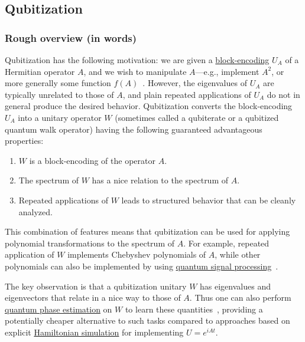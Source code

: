 \newpage



\begin{refsection}

\subsection{Qubitization}\label{prim:Qubitization}

\subsubsection*{Rough overview (in words)}
Qubitization has the following motivation: we are given a \hyperref[prim:BlockEncodings]{block-encoding} $U_A$ of a Hermitian operator $A$, and we wish to manipulate $A$---e.g., implement $A^2$, or more generally some function $f(A)$~\cite{low2016HamSimQubitization}. However, the eigenvalues of $U_A$ are typically unrelated to those of $A$, and plain repeated applications of $U_A$ do not in general produce the desired behavior. Qubitization converts the block-encoding $U_A$ into a unitary operator $W$ (sometimes called a qubiterate or a qubitized quantum walk operator) having the following guaranteed advantageous properties: 
\begin{enumerate}
    \item $W$ is a block-encoding of the operator $A$.
    \item The spectrum of $W$ has a nice relation to the spectrum of $A$.
    \item Repeated applications of $W$ leads to structured behavior that can be cleanly analyzed.
\end{enumerate}
This combination of features means that qubitization can be used for applying polynomial transformations to the spectrum of $A$. For example, repeated application of $W$ implements Chebyshev polynomials of $A$, while other polynomials can also be implemented by using \hyperref[prim:QSP]{quantum signal processing}~\cite{low2016HamSimQSignProc,low2016HamSimQubitization,gilyen2018QSingValTransf}.

The key observation is that a qubitization unitary $W$ has eigenvalues and eigenvectors that relate in a nice way to those of $A$. Thus one can also perform \hyperref[prim:QPE]{quantum phase estimation} on $W$ to learn these quantities~\cite{poulin2018SpectralQubitization, berry2018ImprovedEigenstatesFermionic}, providing a potentially cheaper alternative to such tasks compared to approaches based on explicit \hyperref[prim:HamiltonianSimulation]{Hamiltonian simulation} for implementing $U=e^{iAt}$.


\end{refsection}
